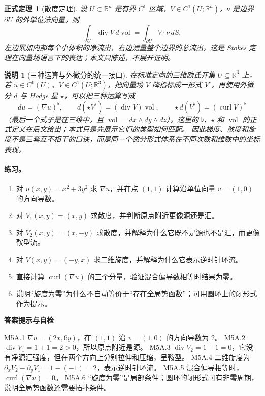 \documentclass[UTF8,fontset=none,a4paper,11pt]{ctexart}
\theoremstyle{foundation-definition}
\theoremstyle{foundation-theorem}
\newtheorem{theorem}[definition]{正式定理}
\theoremstyle{foundation-proposition}
\theoremstyle{foundation-example}
\theoremstyle{foundation-remark}
\newtheorem{remark}[definition]{说明}
\theoremstyle{foundation-theorem}
\newenvironment{answerkey}{%
\begin{mdframed}[backgroundcolor=examplebg,linecolor=examplepurple,linewidth=1.0pt,
  leftline=true,rightline=false,topline=false,bottomline=false,
  skipabove=7pt,skipbelow=8pt,innerleftmargin=10pt,innerrightmargin=8pt,
  innertopmargin=6pt,innerbottommargin=6pt]
{\sffamily\bfseries\color{examplepurple}答案提示与自检}\par\smallskip\small
}{\end{mdframed}}
\begin{document}
\begin{theorem}[散度定理]
设 \(U\subset\mathbb R^n\) 是有界 \(C^1\) 区域，\(V\in C^1(\overline U;\mathbb R^n)\)，\(\nu\) 是边界 \(\partial U\) 的外单位法向量，则
\[
\int_U\operatorname{div}V\,d\operatorname{vol}
=\int_{\partial U}V\cdot\nu\,dS.
\]
左边累加内部每个小体积的净流出，右边测量整个边界的总流出。这是 Stokes 定理在向量场语言下的表达；本文只陈述，不展开证明。
\end{theorem}

\begin{remark}[三种运算与外微分的统一接口]
在标准定向的三维欧氏开集 \(U\subseteq\mathbb R^3\) 上，若
\(u\in C^1(U)\)、\(V\in C^1(U;\mathbb R^3)\)，把向量场 \(V\) 降指标成一形式
\(V^\flat\)，再使用外微分 \(d\) 与 Hodge 星 \(\star\)，可以把三种运算写成
\[
du=(\nabla u)^\flat,\qquad
d(\star V^\flat)=(\operatorname{div}V)\operatorname{vol},
\qquad
\star d(V^\flat)=(\operatorname{curl}V)^\flat
\]
（最后一个式子是在三维中，且 \(\operatorname{vol}=dx\wedge dy\wedge dz\)）。这里的
\(\flat\)、\(\star\) 和 \(\operatorname{vol}\) 的正式定义在后文给出；本式只是先展示它们的类型如何匹配。
因此梯度、散度和旋度不是三套互不相干的口诀，而是同一个微分形式体系在不同次数和维数中的坐标表现。
\end{remark}

\paragraph{练习。}
\begin{enumerate}[label=M5A.\arabic*.]
  \item 对 \(u(x,y)=x^2+3y^2\) 求 \(\nabla u\)，并在点 \((1,1)\) 计算沿单位向量 \(v=(1,0)\) 的方向导数。
  \item 对 \(V_1(x,y)=(x,y)\) 求散度，并判断原点附近更像源还是汇。
  \item 对 \(V_2(x,y)=(x,-y)\) 求散度，并解释为什么它既不是源也不是汇，而更像鞍型流。
  \item 对 \(V(x,y)=(-y,x)\) 求二维旋度，并解释为什么它表示逆时针环流。
  \item 直接计算 \(\operatorname{curl}(\nabla u)\) 的三个分量，验证混合偏导数相等时结果为零。
  \item 说明“旋度为零”为什么不自动等价于“存在全局势函数”；可用圆环上的闭形式作为提示。
\end{enumerate}

\begin{answerkey}
M5A.1 \(\nabla u=(2x,6y)\)，在 \((1,1)\) 沿 \(v=(1,0)\) 的方向导数为 \(2\)。
M5A.2 \(\operatorname{div}V_1=1+1=2>0\)，所以原点附近是源。
M5A.3 \(\operatorname{div}V_2=1-1=0\)，它没有净源汇强度，但在两个方向上分别拉伸和压缩，呈鞍型。
M5A.4 二维旋度为 \(\partial_xV_2-\partial_yV_1=1-(-1)=2\)，表示逆时针环流。
M5A.5 混合偏导相等时，\(\operatorname{curl}(\nabla u)=0\)。
M5A.6 “旋度为零”是局部条件；圆环的闭形式可有非零周期，说明全局势函数还需要拓扑条件。
\end{answerkey}
\end{document}
